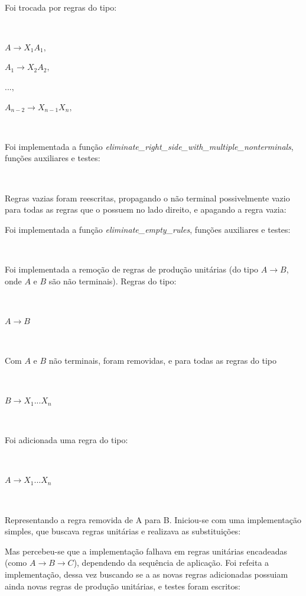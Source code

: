 \documentclass[conference]{IEEEtran}
\begin{document}
\

Foi trocada por regras do tipo:

\

$A \to X_1 A_1,$

$A_1 \to X_2 A_2,$

$... ,$

$A_{n-2} \to X_{n-1} X_n,$

\

Foi implementada a função \emph{eliminate\_right\_side\_with\_multiple\_nonterminals}, funções auxiliares e testes:



\



Regras vazias foram reescritas, propagando o não terminal possivelmente vazio para todas as regras que o possuem no lado direito, e apagando a regra vazia:

Foi implementada a função \emph{eliminate\_empty\_rules}, funções auxiliares e testes:



\



Foi implementada a remoção de regras de produção unitárias (do tipo $A \to B$, onde $A$ e $B$ são não terminais). Regras do tipo:

\

$A \to B$

\

Com $A$ e $B$ não terminais, foram removidas, e para todas as regras do tipo

\

$B \to X_1 ... X_n$

\

Foi adicionada uma regra do tipo:

\

$A \to X_1 ... X_n$

\

Representando a regra removida de A para B. Iniciou-se com uma implementação simples, que buscava regras unitárias e realizava as substituições:



Mas percebeu-se que a implementação falhava em regras unitárias encadeadas (como $A \to B \to C$), dependendo da sequência de aplicação. Foi refeita a implementação, dessa vez buscando se a as novas regras adicionadas possuiam ainda novas regras de produção unitárias, e testes foram escritos:
\end{document}
